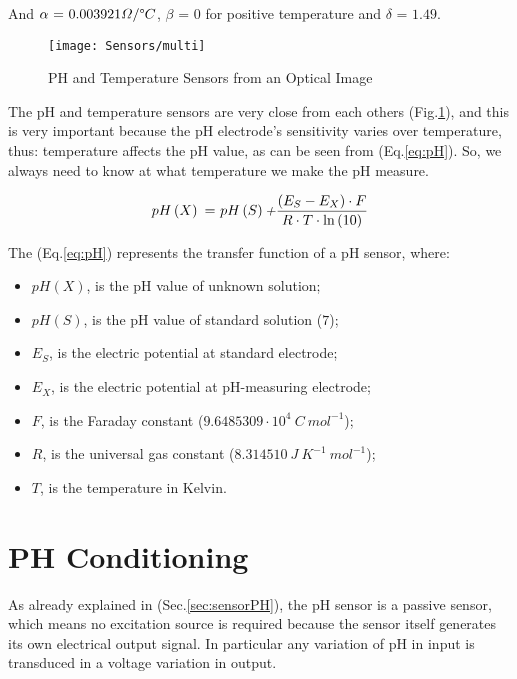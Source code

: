 And $\alpha \text{ = } 0.003921 \varOmega/\text{\textdegree}C$, $\beta  \text{ = } 0$ for positive temperature and $\delta  \text{ = } 1.49$.

 
 \begin{figure}[h]
 	\centering
 	\texttt{[image: Sensors/multi]}
 	\caption{PH and Temperature Sensors from an Optical Image}
 	\label{Fig:close}
 	
 \end{figure}
 
 The pH and temperature sensors are very close from each others (Fig.\ref{Fig:close}), and this is very important because the pH electrode's sensitivity varies over temperature, thus: temperature affects the pH value, as can be seen from (Eq.\ref{eq:pH}). So, we always need to know at what temperature  we make the pH measure.
 
 \begin{equation}
 pH\left(X\right) \text{ = } pH\left(S\right) \text{\textit{+}} \frac{\left(E_S - E_X\right) \cdot F}{R \cdot T \cdot \ln\left(10 \right)} 
 \label{eq:pH}
 \end{equation}
 
 The (Eq.\ref{eq:pH}) represents the transfer function of a pH sensor, where:
 \begin{itemize}
 	\item $pH\left(X\right)$, is the pH value of unknown solution;
 	\item $pH\left(S\right)$, is the pH value of standard solution ($7$);
 	\item $E_S$, is the electric potential at standard electrode;
 	\item $E_X$, is the electric potential at pH-measuring electrode;
 	\item $F$, is the Faraday constant ($9.6485309\cdot10^4\ C\ mol^{-1}$);
 	\item $R$, is the universal gas constant ($8.314510\ J\ K^{-1}\ mol^{-1}$);
 	\item $T$, is the temperature in Kelvin.
 \end{itemize}
 
 
 
 
\section{PH Conditioning}\label{phcon}

\label{sec:circuitPH}
As already explained in (Sec.\ref{sec:sensorPH}), the pH sensor is a passive sensor, which means no excitation source is required because the sensor itself generates its own electrical output signal. In particular any variation of pH in input is transduced in a voltage variation in output.\\

